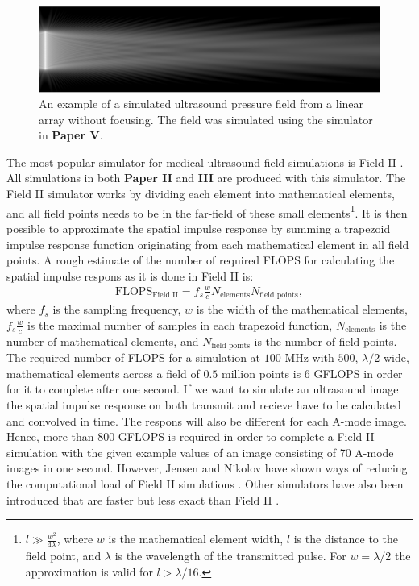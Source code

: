 \begin{figure}[t!]
\centering
\includegraphics[width=\textwidth]{img/hos.eps}
\caption{An example of a simulated ultrasound pressure field from a linear array without focusing. The field was simulated using the simulator in \textbf{Paper V}.}
\label{fig:hos}
\end{figure}

The most popular simulator for medical ultrasound field simulations is Field II \cite{Jensen1992}. All simulations in both \textbf{Paper II} and \textbf{III} are produced with this simulator. The Field II simulator works by dividing each element into mathematical elements, and all field points needs to be in the far-field of these small elements\footnote{$l\gg\frac{w^2}{4\lambda}$, where $w$ is the mathematical element width, $l$ is the distance to the field point, and $\lambda$ is the wavelength of the transmitted pulse. For $w=\lambda/2$ the approximation is valid for $l>\lambda/16$.}. It is then possible to approximate the spatial impulse response by summing a trapezoid impulse response function originating from each mathematical element \cite{Jensen1992} in all field points. A rough estimate of the number of required FLOPS for calculating the spatial impulse respons as it is done in Field II is:
\begin{align}
\text{FLOPS}_\text{Field II} = f_s\frac{w}{c}N_{\text{elements}}N_{\text{field points}},
\end{align}
where $f_s$ is the sampling frequency, $w$ is the width of the mathematical elements, $f_s\frac{w}{c}$ is the maximal number of samples in each trapezoid function, $N_{\text{elements}}$ is the number of mathematical elements, and $N_{\text{field points}}$ is the number of field points. The required number of FLOPS for a simulation at $100$ MHz with $500$, $\lambda/2$ wide, mathematical elements across a field of $0.5$ million points is $6$ GFLOPS in order for it to complete after one second. If we want to simulate an ultrasound image the spatial impulse response on both transmit and recieve have to be calculated and convolved in time. The respons will also be different for each A-mode image. Hence, more than 800 GFLOPS is required in order to complete a Field II simulation with the given example values of an image consisting of 70 A-mode images in one second. However, Jensen and Nikolov have shown ways of reducing the computational load of Field II simulations \cite{Jensen2000}. Other simulators have also been introduced that are faster but less exact than Field II \cite{Hergum2009}.

